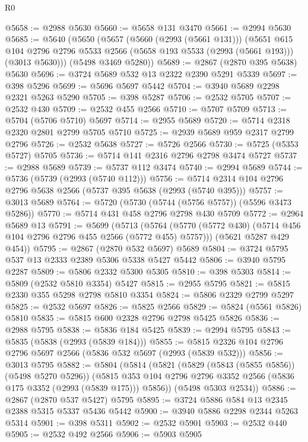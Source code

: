\begin{lexlean}{R0}
\begin{coremodule}
@5658 := @2988 @5630
@5660 := @5658 @131 @3470
@5661 := @2994 @5630
@5685 := @5640
    (@5650
      (@5657
        (@5660 (@2993 (@5661 @131)))
        (@5651
          @615
          @104
          @2796
          @2796
          @5533
          @2566
          (@5658 @193 @5533 (@2993 (@5661 @193)))
          (@3013 @5630)))
      (@5498 @3469 @5280))
@5689 := @2867 (@2870 @395 @5638) @5630
@5696 := @3724 @5689 @532 @13 @2322 @2390 @5291 @5339
@5697 := @398 @5296
@5699 := @5696 @5697 @5442
@5704 := @3940 @5689 @2298 @2321 @5263 @5290
@5705 := @398 @5287
@5706 := @2532 @5705
@5707 := @2532 @430
@5709 := @2532 @455 @2566
@5710 := @5707 @5709
@5713 := @5704 (@5706 @5710) @5697
@5714 := @2955 @5689
@5720 := @5714 @2318 @2320 @2801 @2799 @5705 @5710
@5725 := @2939 @5689 @959 @2317 @2799 @2796
@5726 := @2532 @5638
@5727 := @5726 @2566
@5730 := @5725 (@5353 @5727) @5705
@5736 := @5714 @141 @2316 @2796 @2798 @3474 @5727
@5737 := @2988 @5689
@5739 := @5737 @112 @3474
@5740 := @2994 @5689
@5744 := @5736 (@5739 (@2993 (@5740 @112)))
@5756 := @5714 @2314 @104 @2796 @2796 @5638 @2566 (@5737 @395 @5638 (@2993 (@5740 @395)))
@5757 := @3013 @5689
@5764 := @5720 (@5730 (@5744 (@5756 @5757)) (@5596 @3473 @5286))
@5770 := @5714 @431 @458 @2796 @2798 @430 @5709
@5772 := @2964 @5689 @13
@5791 := @5699
    (@5713
      (@5764 (@5770 (@5772 @430) (@5714 @456 @104 @2796 @2796 @455 @2566 (@5772 @455) @5757)))
      (@5621 @5287 @429 @454))
@5795 := @2867 (@2870 @532 @5697) @5689
@5804 := @3724 @5795 @537 @13 @2333 @2389 @5306 @5338 @5427 @5442
@5806 := @3940 @5795 @2287
@5809 := @5806 @2332 @5300 @5305
@5810 := @398 @5303
@5814 := @5809 (@2532 @5810 @3354) @5427
@5815 := @2955 @5795
@5821 := @5815 @2330 @355 @5298 @2798 @5810 @3354
@5824 := @5806 @2329 @2799 @5297
@5825 := @2532 @5697
@5826 := @5825 @2566
@5829 := @5824 (@5561 @5826) @5810
@5835 := @5815 @600 @2328 @2796 @2798 @5425 @5826
@5836 := @2988 @5795
@5838 := @5836 @184 @5425
@5839 := @2994 @5795
@5843 := @5835 (@5838 (@2993 (@5839 @184)))
@5855 := @5815 @2326 @104 @2796 @2796 @5697 @2566 (@5836 @532 @5697 (@2993 (@5839 @532)))
@5856 := @3013 @5795
@5882 := @5804
    (@5814
      (@5821
        (@5829 (@5843 (@5855 @5856)) (@5498 @5270 @5296))
        (@5815 @353 @104 @2796 @2796 @3352 @2566 (@5836 @175 @3352 (@2993 (@5839 @175))) @5856))
      (@5498 @5303 @2534))
@5886 := @2867 (@2870 @537 @5427) @5795
@5895 := @3724 @5886 @584 @13 @2345 @2388 @5315 @5337 @5436 @5442
@5900 := @3940 @5886 @2298 @2344 @5263 @5314
@5901 := @398 @5311
@5902 := @2532 @5901
@5903 := @2532 @440
@5905 := @2532 @492 @2566
@5906 := @5903 @5905

\end{coremodule}
\end{lexlean}
